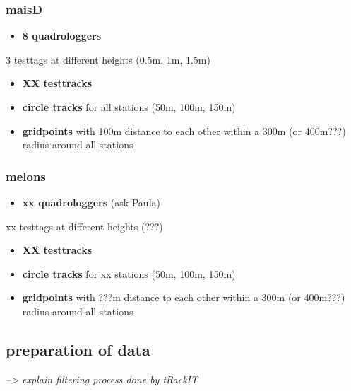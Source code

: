 \documentclass[
]{article}
\providecommand{\tightlist}{%
  \setlength{\itemsep}{0pt}\setlength{\parskip}{0pt}}\usepackage{longtable,booktabs,array}
\begin{document}
\subsubsection{maisD}\label{maisd}

\begin{itemize}
\tightlist
\item
  \textbf{8 quadrologgers}
\end{itemize}

3 testtags at different heights (0.5m, 1m, 1.5m)

\begin{itemize}
\tightlist
\item
  \textbf{XX testtracks}\\
\item
  \textbf{circle tracks} for all stations (50m, 100m, 150m)\\
\item
  \textbf{gridpoints} with 100m distance to each other within a 300m (or
  400m???) radius around all stations
\end{itemize}

\subsubsection{melons}\label{melons}

\begin{itemize}
\tightlist
\item
  \textbf{xx quadrologgers} (ask Paula)
\end{itemize}

xx testtags at different heights (???)

\begin{itemize}
\tightlist
\item
  \textbf{XX testtracks}\\
\item
  \textbf{circle tracks} for xx stations (50m, 100m, 150m)\\
\item
  \textbf{gridpoints} with ???m distance to each other within a 300m (or
  400m???) radius around all stations
\end{itemize}

\subsection{preparation of data}\label{preparation-of-data}

\emph{--\textgreater{} explain filtering process done by tRackIT}
\end{document}
